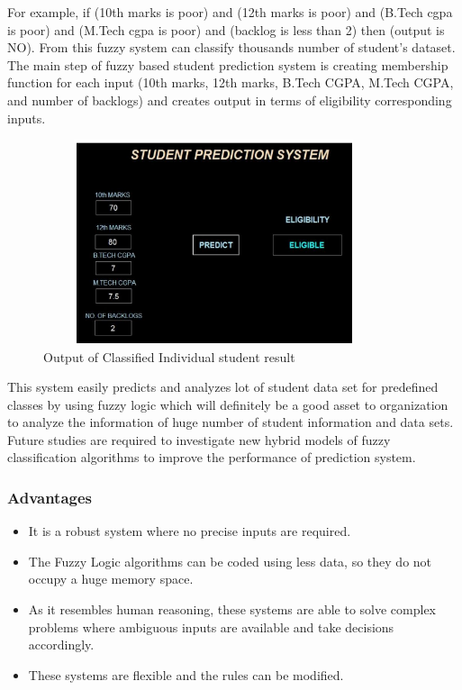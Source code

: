 \documentclass[12pt]{article}
\begin{document}
For example, if (10th marks is poor) 
and (12th marks is poor) and (B.Tech cgpa is poor) and (M.Tech 
cgpa is poor) and (backlog is less than 2) then (output is NO). 
From this fuzzy system can classify thousands number of 
student’s dataset. 
The main step of fuzzy based student prediction system is 
creating membership function for each input (10th marks, 12th
marks, B.Tech CGPA, M.Tech CGPA, and number of backlogs) 
and creates output in terms of eligibility corresponding inputs.

\begin{figure}[H]
\begin{center}
 \includegraphics[width=10cm, height=6cm]{L3P2}
\caption{Output of Classified Individual student result}
\end{center}
\end{figure}

This system easily predicts and analyzes lot of student data set 
for predefined classes by using fuzzy logic which will definitely 
be a good asset to organization to analyze the information of huge 
number of student information and data sets. Future studies are 
required to investigate new hybrid models of fuzzy classification 
algorithms to improve the performance of prediction system.

\newpage
\subsubsection{Advantages}
\begin{itemize}
\item It is a robust system where no precise inputs are required.
\item The Fuzzy Logic algorithms can be coded using less data, so they do not occupy a huge memory space.
\item As it resembles human reasoning, these systems are able to solve complex problems where ambiguous inputs are available and take decisions accordingly.
\item These systems are flexible and the rules can be modified.
\end{itemize}
\vspace{10px}
\end{document}
